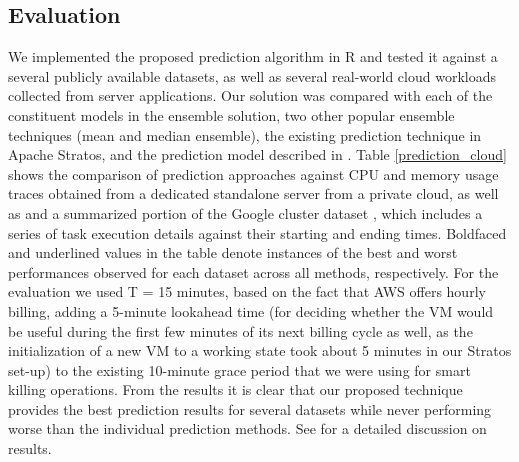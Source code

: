 \subsection{Evaluation}

We implemented the proposed prediction algorithm in R and tested it against a several publicly available datasets, as well as several real-world cloud workloads \cite{AutoscaleAnalyser} collected from server applications. Our solution was compared with each of the constituent models in the ensemble solution, two other popular ensemble techniques (mean and median ensemble), the existing prediction technique in Apache Stratos, and the prediction model described in \cite{Roy_2011}. Table \ref{prediction_cloud} shows the comparison of prediction approaches against CPU and memory usage traces obtained from a dedicated standalone server from a private cloud, as well as and a summarized portion of the Google cluster dataset \cite{GoogleClusterData}, which includes a series of task execution details against their starting and ending times. Boldfaced and underlined values in the table denote instances of the best and worst performances observed for each dataset across all methods, respectively. For the evaluation we used T = 15 minutes, based on the fact that AWS offers hourly billing, adding a 5-minute lookahead time (for deciding whether the VM would be useful during the first few minutes of its next billing cycle as well, as the initialization of a new VM to a working state took about 5 minutes in our Stratos set-up) to the existing 10-minute grace period that we were using for smart killing operations. From the results it is clear that our proposed technique provides the best prediction results for several datasets while never performing worse than the individual prediction methods. See \cite{cloudtech} for a detailed discussion on results.

